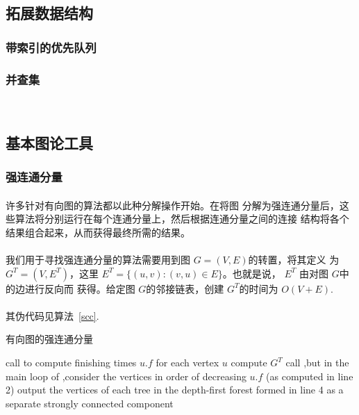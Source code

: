 \documentclass[UTF8,a4paper]{ctexart}
\begin{document}
\subsection{拓展数据结构}
\subsubsection{带索引的优先队列~\cite{algs4}}\label{sec:indexedpq}

\subsubsection{并查集}~\cite{introtoalgo}\label{sec:unionfind}
\paragraph{}

\subsection{基本图论工具}
\subsubsection{强连通分量}
\paragraph{}许多针对有向图的算法都以此种分解操作开始。在将图 分解为强连通分量后，这些算法将分别运行在每个连通分量上，然后根据连通分量之间的连接 结构将各个结果组合起来，从而获得最终所需的结果。
\paragraph{}我们用于寻找强连通分量的算法需要用到图 $G=(V, E)$的转置，将其定义
为 $G^T=(V,E^T)$，这里 $E^T=\{(u, v): (v, u) \in E\}$。也就是说， $E^T$ 由对图 $G$中的边进行反向而 获得。给定图 $G$的邻接链表，创建 $G^T$的时间为 $O(V+E)$.
\paragraph{}其伪代码见算法~\ref{scc}.
\begin{algorithm}
    \caption{有向图的强连通分量}\label{scc}
    \begin{algorithmic}[1] %
        \State call  to compute finishing times {$u.f$} for each vertex {$u$}
        \State compute {$G^T$}
        \State call ,but in the main loop of ,consider the vertices in order of decreasing {$u.f$} (as computed in line 2)
        \State output the vertices of each tree in the depth-first forest formed in line 4 as a separate strongly connected component
        \EndFunction
    \end{algorithmic}
\end{algorithm}
\end{document}
